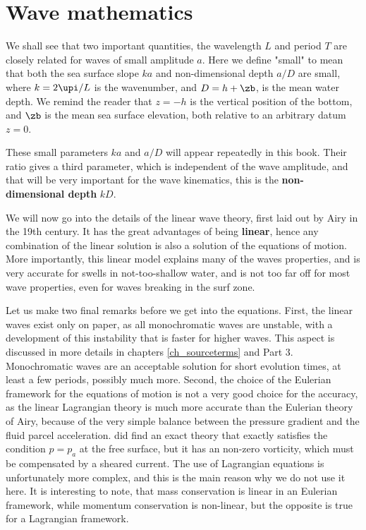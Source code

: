 \section{Wave mathematics}
We shall see that two important quantities, the wavelength $L$ and period $T$ are closely related 
for waves of small amplitude $a$. Here we define "small" to  mean that both the sea surface slope $ka$ and non-dimensional depth $a/D$ are small, 
where $k=2\upi/L$ is the wavenumber, and $D=h+\zb$, is the mean water depth. We remind the reader that $z=-h$
is the vertical position of the bottom, and $\zb$ is the mean sea surface elevation, both relative to an arbitrary datum 
$z=0$.

These small parameters $ka$ and $a/D$ will appear repeatedly in this book. Their ratio gives a third parameter, which is independent 
of the wave amplitude, and that will be very important for the wave kinematics, this is the 
\textbf{non-dimensional depth} $kD$.

We will now go into the details of the linear wave theory, first 
laid out by Airy in the 19th century. It has the great advantages of being  \textbf{linear}, hence any combination of the 
linear solution is also a solution of the equations of motion. More importantly, this linear model explains many of the waves properties, 
and is very accurate for swells in not-too-shallow water, and is not too far off for most wave properties, even for waves 
breaking in the surf zone.  

Let us make two final remarks before we get into the equations. 
First, the linear waves exist only on paper, as all monochromatic waves are unstable, with a development of this instability 
that is faster for higher waves. This aspect is discussed in more details in chapters \ref{ch_sourceterms} and Part 3. 
Monochromatic waves are an acceptable solution for short evolution times, at least a few periods, possibly much more. Second, 
the choice of the Eulerian framework for the equations of motion
is not a very good choice for the accuracy, as the linear Lagrangian theory 
is much more accurate than the Eulerian theory of Airy, because of the very simple balance between the pressure gradient and the 
fluid parcel acceleration.  
\cite{vonGerstner1809} did find an exact theory that exactly satisfies the condition $p=p_a$ at the free surface, 
but it has an non-zero vorticity, which must be compensated by a sheared current. 
The use of Lagrangian equations is unfortunately 
more complex, and this is the main reason why we do not use it here. It is interesting to note, that 
mass conservation is linear in an Eulerian framework, 
while momentum conservation is non-linear, but the opposite is true for a Lagrangian framework. 

